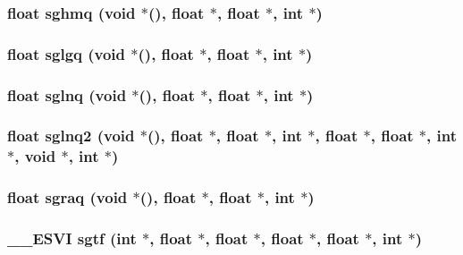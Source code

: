\subsubsection{\setlength{\rightskip}{0pt plus 5cm}float sghmq (void $\ast$(), float $\ast$, float $\ast$, int $\ast$)}\label{essl_8h_91b257168b89b22529458e9f6fff9212}


\subsubsection{\setlength{\rightskip}{0pt plus 5cm}float sglgq (void $\ast$(), float $\ast$, float $\ast$, int $\ast$)}\label{essl_8h_20ed4f9201a05c2540ff90c625a3d29a}


\subsubsection{\setlength{\rightskip}{0pt plus 5cm}float sglnq (void $\ast$(), float $\ast$, float $\ast$, int $\ast$)}\label{essl_8h_d7e2ffe1f2a2cfc5088516382477d610}


\subsubsection{\setlength{\rightskip}{0pt plus 5cm}float sglnq2 (void $\ast$(), float $\ast$, float $\ast$, int $\ast$, float $\ast$, float $\ast$, int $\ast$, void $\ast$, int $\ast$)}\label{essl_8h_fd2cdc8a58582b1f367c0de4c299a096}


\subsubsection{\setlength{\rightskip}{0pt plus 5cm}float sgraq (void $\ast$(), float $\ast$, float $\ast$, int $\ast$)}\label{essl_8h_a887be212952f1246db5d1d98d6d2318}


\subsubsection{\setlength{\rightskip}{0pt plus 5cm}\_\-\_\-ESVI sgtf (int $\ast$, float $\ast$, float $\ast$, float $\ast$, float $\ast$, int $\ast$)}\label{essl_8h_6f1c52d0b3fbcbdba71140d65e320647}


